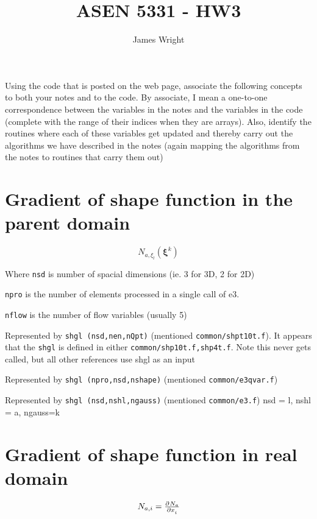 \documentclass[12pt, letterpaper, twoside]{article}
\title{ASEN 5331 - HW3}
\author{James Wright}
\renewcommand{\vec}[1]{\bm{#1}}
\newcommand{\0}{\vec{0}}
\begin{document}
\maketitle

Using the code that is posted on the web page, associate the following concepts to both your notes and to the code. By associate, I mean a one-to-one correspondence 
between the variables in the notes and the variables in the code (complete with the range of their indices when they are arrays). Also, identify the routines where each 
of these variables get updated and thereby carry out the algorithms we have described in the notes (again mapping the algorithms from the notes to routines that carry them out)


\section{Gradient of shape function in the parent domain}

    \begin{equation}
        N_{a,\xi_l} (\vec{\xi}^k)
    \end{equation}


    Where \texttt{nsd} is number of spacial dimensions (ie. 3 for 3D, 2 for 2D)
    
    \texttt{npro} is the number of elements processed in a single call of e3.

    \texttt{nflow} is the number of flow variables (usually 5)

    Represented by \texttt{shgl (nsd,nen,nQpt)} (mentioned \texttt{common/shpt10t.f}). 
    It appears that the \texttt{shgl} is defined in either \texttt{common/{shp10t.f,shp4t.f}}. Note this never gets called, but all other references use shgl as an input

    Represented by \texttt{shgl (npro,nsd,nshape)} (mentioned \texttt{common/e3qvar.f})

    Represented by \texttt{shgl (nsd,nshl,ngauss)} (mentioned \texttt{common/e3.f})
    nsd = l, nshl = a, ngauss=k

\section{Gradient of shape function in real domain}

    \begin{equation}
        N_{a,i} = \pd{N_a}{x_i}
    \end{equation}
\end{document}
